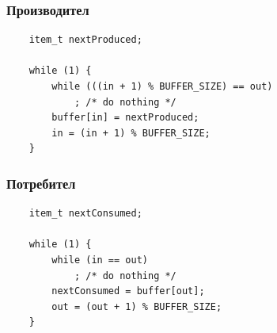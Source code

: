 \documentclass[ignorenonframetext, hyperref=unicode]{beamer}
\begin{document}
\begin{frame}[containsverbatim]
\frametitle{Производител}
\begin{lstlisting}
	item_t nextProduced;

	while (1) {
		while (((in + 1) % BUFFER_SIZE) == out)
			; /* do nothing */
		buffer[in] = nextProduced;
		in = (in + 1) % BUFFER_SIZE;
	}
\end{lstlisting}
\end{frame}


\begin{frame}[containsverbatim]
\frametitle{Потребител}
\begin{lstlisting}
	item_t nextConsumed;

	while (1) {
		while (in == out)
			; /* do nothing */
		nextConsumed = buffer[out];
		out = (out + 1) % BUFFER_SIZE;
	}
\end{lstlisting}
\end{frame}
        
\end{document}
